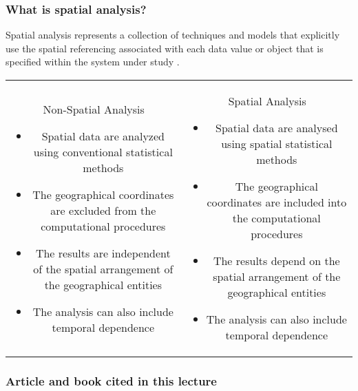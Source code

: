 \documentclass[12pt]{beamer}
\begin{document}
\begin{frame}
\frametitle{What is spatial analysis?}
Spatial analysis represents a collection of techniques and models that explicitly use the spatial referencing associated with each data value or object that is specified within the system under study \citep{Haining2003}.
\begin{scriptsize}
\begin{tabular}{cc}
\begin{minipage}{0.45\linewidth}
\begin{alertblock}{\small Non-Spatial Analysis}
\begin{itemize}
\item Spatial data are analyzed using conventional statistical methods
\item The geographical coordinates are excluded from the computational procedures
\item The results are independent of the spatial arrangement of the geographical entities
\item The analysis can also include temporal dependence
\end{itemize}
\end{alertblock}
\end{minipage}

&

\begin{minipage}{0.45\linewidth}
\begin{alertblock}{\small Spatial Analysis}
\begin{itemize}
\item Spatial data are analysed using spatial statistical methods
\item The geographical coordinates are included into the computational procedures
\item The results depend on the spatial arrangement of the geographical entities
\item The analysis can also include temporal dependence
\end{itemize}
\end{alertblock}
\end{minipage}
\end{tabular}
\end{scriptsize}
\end{frame}

\begin{frame}
\frametitle{Article and book cited in this lecture}
\footnotesize{


}
\end{frame}
\end{document}
